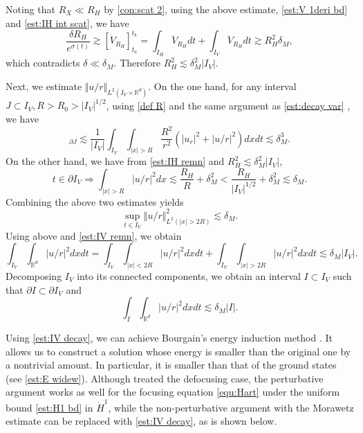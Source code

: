 \documentclass[reqno, 11pt]{amsart}
\numberwithin{equation}{section}
\newcommand{\R}{\mathbb{R}}
\theoremstyle{plain}
\theoremstyle{definition}
\numberwithin{equation}{section}
\numberwithin{theorem}{section}
\numberwithin{equation}{section}
\numberwithin{equation}{section}
\numberwithin{theorem}{section}
\begin{document}
	Noting that $R_X \ll R_H$ by \eqref{con:scat 2}, using the above estimate, \eqref{est:V 1deri bd} and \eqref{est:IH int scat}, we have
	\begin{equation*}
	\frac{\delta R_{H}}{e^{\sigma(t)}}\gtrsim [\dot{V}_{R_H}]_{t_a}^{t_b} =\int_{I_H}\ddot{V}_{R_H} dt+\int_{I_V}\ddot{V}_{R_H} dt \gtrsim R_{H}^{2}\delta_{M},
	\end{equation*}
	which contradicts $\delta\ll \delta_{M}$. Therefore $R_{H}^{2} \lesssim  \delta_{M}^{2}|I_V|$.
	
	Next, we estimate $\Vert u/r \Vert_{L^2(I_V \times \R^d)}$. On the one hand, for any interval $J\subset I_V, R>R_0>|I_V|^{1/2}$, using \eqref{def R} and the same argument as \eqref{est:decay var} , we have
	\begin{equation*}
	[\langle |u/r|^2,\phi_{R}^{C} \rangle]_{\partial J}\lesssim \frac{1}{|I_V|}\int_{I_V}\int_{|x|>R} \frac{R^2}{r^2}\left( |u_r|^2+|u/r|^2 \right) dxdt \lesssim \delta_{M}^{3}.
	\end{equation*}
	On the other hand, we have from \eqref{est:IH remn} and  $R_{H}^{2} \lesssim  \delta_{M}^{2}|I_V|$,
	\begin{equation*}
	t\in \partial I_V \Longrightarrow \int_{|x|>R} |u/r|^2 dx \lesssim \frac{R_H}{R}+\delta_{M}^{2} < \frac{R_H}{|I_V|^{1/2}}+\delta_{M}^{2} \lesssim \delta_{M}.
	\end{equation*}
	Combining the above two estimates yields 
	\begin{equation*}
	\sup_{t\in I_V} \Vert u/r \Vert_{L^2(|x|>2R)}^{2} \lesssim \delta_{M}.
	\end{equation*}
	Using above and \eqref{est:IV remn}, we obtain
	\begin{equation*}
	\int_{I_V} \int_{\R^d} |u/r|^2 dxdt=\int_{I_V} \int_{|x|<2R} |u/r|^2 dxdt+\int_{I_V} \int_{|x|>2R} |u/r|^2 dxdt \lesssim \delta_{M}|I_V|.
	\end{equation*}
	Decomposing $I_V$ into its connected components, we obtain an interval $I\subset I_V$ such that $\partial I\subset \partial I_V$ and
	\begin{equation}\label{est:IV decay}
	\int_I \int_{\R^d} |u/r|^2 dxdt \lesssim \delta_{M}|I|.
	\end{equation}
	
	Using \eqref{est:IV decay}, we can achieve Bourgain's energy induction method \cite{Bourg}. It allows us to construct a solution whose energy is smaller than the original one by a nontrivial amount. In particular, it is smaller than that of the ground states (see \eqref{est:E widew}). Although \cite{Bourg,MXZ:crit Hart:def rad} treated the defocusing case, the perturbative argument works as well for the focusing equation \eqref{equ:Hart} under the uniform bound \eqref{est:H1 bd} in $\dot{H}^1$, while the non-perturbative argument with the Morawetz estimate can be replaced with \eqref{est:IV decay}, as is shown below.
	
\end{document}
